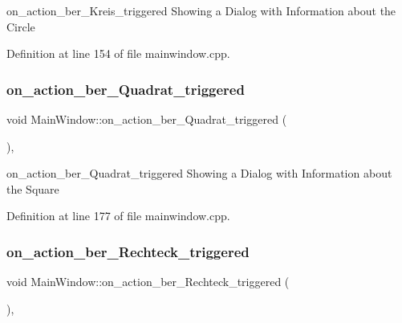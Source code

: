 on\+\_\+action\+\_\+ber\+\_\+\+Kreis\+\_\+triggered Showing a Dialog with Information about the Circle 



Definition at line 154 of file mainwindow.\+cpp.

\mbox{\label{class_main_window_aae8a9cc8485e71157bc123455a5e4ceb}} 
\subsubsection{\texorpdfstring{on\+\_\+action\+\_\+ber\+\_\+\+Quadrat\+\_\+triggered}{on\_action\_ber\_Quadrat\_triggered}}
{\footnotesize\ttfamily void Main\+Window\+::on\+\_\+action\+\_\+ber\+\_\+\+Quadrat\+\_\+triggered (\begin{DoxyParamCaption}{ }\end{DoxyParamCaption})\hspace{0.3cm}{\ttfamily [private]}, {\ttfamily [slot]}}



on\+\_\+action\+\_\+ber\+\_\+\+Quadrat\+\_\+triggered Showing a Dialog with Information about the Square 



Definition at line 177 of file mainwindow.\+cpp.

\mbox{\label{class_main_window_a8581f17d3139d11adedbc775cb17c453}} 
\subsubsection{\texorpdfstring{on\+\_\+action\+\_\+ber\+\_\+\+Rechteck\+\_\+triggered}{on\_action\_ber\_Rechteck\_triggered}}
{\footnotesize\ttfamily void Main\+Window\+::on\+\_\+action\+\_\+ber\+\_\+\+Rechteck\+\_\+triggered (\begin{DoxyParamCaption}{ }\end{DoxyParamCaption})\hspace{0.3cm}{\ttfamily [private]}, {\ttfamily [slot]}}



